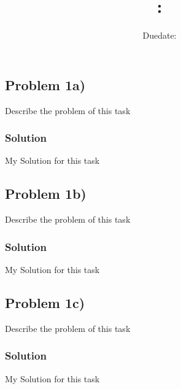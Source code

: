 \documentclass[oneside]{article}
\title{
    \textsf{\textbf{\hmwkSubject: \hmwkTitle}}
}
\author{\hmwkAuthor}
\date{Duedate: \hmwkDueDate}
\begin{document}
\maketitle
\thispagestyle{firststyle}
\vspace{1cm}


\subsection*{Problem 1a)}
Describe the problem of this task

\subsubsection*{Solution}
My Solution for this task

\vspace{1cm}

\subsection*{Problem 1b)}
Describe the problem of this task

\subsubsection*{Solution}
My Solution for this task

\vspace{1cm}

\subsection*{Problem 1c)}
Describe the problem of this task

\subsubsection*{Solution}
My Solution for this task

\vspace{1cm}


\label{LastPage}
\end{document}
